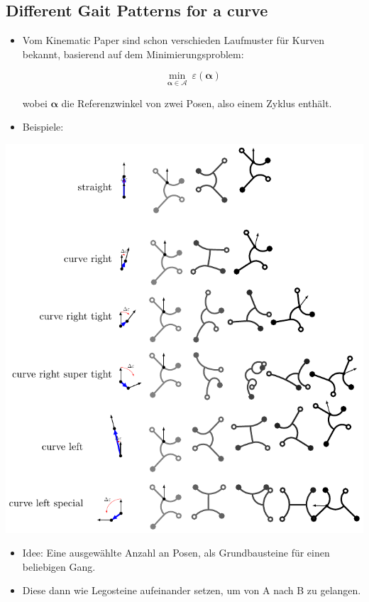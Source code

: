 \documentclass[10pt,a4paper]{article}
\begin{document}
\subsection{Different Gait Patterns for a curve}

\begin{itemize}
	\item Vom Kinematic Paper sind schon verschieden Laufmuster für Kurven bekannt, basierend auf dem Minimierungsproblem:
	
	\begin{equation}
		\displaystyle\min_{\bm{\alpha} \in \mathcal{A}} ~ \varepsilon(\bm{\alpha})
	\end{equation}
	
	wobei $\bm{\alpha}$ die Referenzwinkel von zwei Posen, also einem Zyklus enthält.

	\item Beispiele:

\end{itemize}

\includegraphics[width=.95\textwidth]{pics/trajectory_planner/elements.pdf}

\begin{itemize}
	\item Idee: Eine ausgewählte Anzahl an Posen, als Grundbausteine für einen beliebigen Gang.
	
	\item Diese dann wie Legosteine aufeinander setzen, um von A nach B zu gelangen.
\end{itemize}
\end{document}
